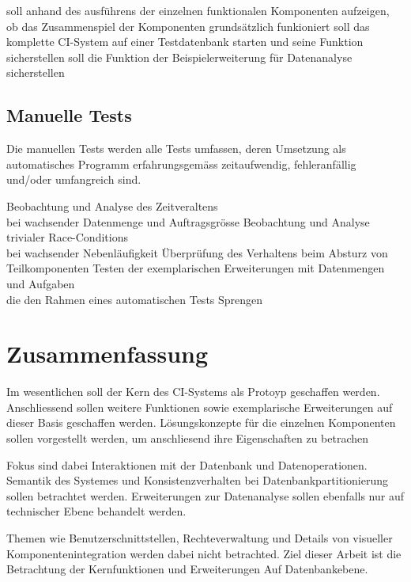 \begin{description}
  \dhitem[Komponentendurchlauf]
    soll anhand des ausf\"uhrens der einzelnen funktionalen Komponenten
    aufzeigen, ob das Zusammenspiel der Komponenten
    grunds\"atzlich funkioniert
  \dhitem[Komplettstystem]
    soll das komplette CI-System auf einer Testdatenbank starten
    und seine Funktion sicherstellen
    soll die Funktion der Beispielerweiterung f\"ur Datenanalyse sicherstellen
\end{description}

\subsection{Manuelle Tests}

Die manuellen Tests werden alle Tests umfassen,
deren Umsetzung als automatisches Programm erfahrungsgem\"ass zeitaufwendig,
fehleranf\"allig und/oder umfangreich sind.


\begin{description}
    Beobachtung und Analyse des Zeitveraltens \\
    bei wachsender Datenmenge und Auftragsgr\"osse
    Beobachtung und Analyse trivialer Race-Conditions \\
    bei wachsender Nebenl\"aufigkeit
    \"Uberpr\"ufung des Verhaltens beim Absturz von Teilkomponenten
    Testen der exemplarischen Erweiterungen mit Datenmengen und Aufgaben \\
    die den Rahmen eines automatischen Tests Sprengen
\end{description}

\section{Zusammenfassung}


Im wesentlichen soll der Kern des CI-Systems als Protoyp geschaffen werden.
Anschliessend sollen weitere Funktionen sowie exemplarische Erweiterungen
auf dieser Basis geschaffen werden.
L\"osungskonzepte f\"ur die einzelnen Komponenten sollen vorgestellt werden,
um anschliesend ihre Eigenschaften zu betrachen

Fokus sind dabei Interaktionen mit der Datenbank und Datenoperationen.
Semantik des Systemes und Konsistenzverhalten bei Datenbankpartitionierung
sollen betrachtet werden. Erweiterungen zur Datenanalyse sollen ebenfalls nur auf technischer Ebene behandelt werden.

Themen wie Benutzerschnittstellen, Rechteverwaltung und Details von visueller Komponentenintegration werden dabei nicht betrachted.
Ziel dieser Arbeit ist die Betrachtung der Kernfunktionen und Erweiterungen Auf Datenbankebene.

